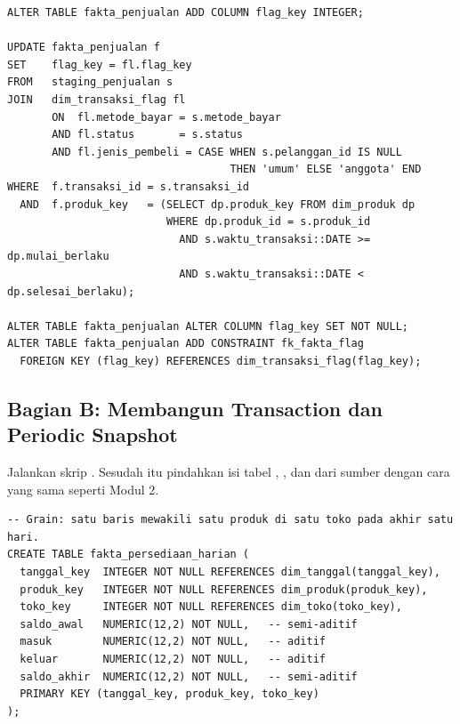 \begin{lstlisting}[style=sqlgaya]
ALTER TABLE fakta_penjualan ADD COLUMN flag_key INTEGER;

UPDATE fakta_penjualan f
SET    flag_key = fl.flag_key
FROM   staging_penjualan s
JOIN   dim_transaksi_flag fl
       ON  fl.metode_bayar = s.metode_bayar
       AND fl.status       = s.status
       AND fl.jenis_pembeli = CASE WHEN s.pelanggan_id IS NULL
                                   THEN 'umum' ELSE 'anggota' END
WHERE  f.transaksi_id = s.transaksi_id
  AND  f.produk_key   = (SELECT dp.produk_key FROM dim_produk dp
                         WHERE dp.produk_id = s.produk_id
                           AND s.waktu_transaksi::DATE >= dp.mulai_berlaku
                           AND s.waktu_transaksi::DATE <  dp.selesai_berlaku);

ALTER TABLE fakta_penjualan ALTER COLUMN flag_key SET NOT NULL;
ALTER TABLE fakta_penjualan ADD CONSTRAINT fk_fakta_flag
  FOREIGN KEY (flag_key) REFERENCES dim_transaksi_flag(flag_key);
\end{lstlisting}

\subsection{Bagian B: Membangun Transaction dan Periodic Snapshot}


Jalankan skrip . Sesudah itu pindahkan isi tabel
, , dan
 dari sumber dengan cara yang sama seperti Modul 2.


\begin{lstlisting}[style=sqlgaya]
-- Grain: satu baris mewakili satu produk di satu toko pada akhir satu hari.
CREATE TABLE fakta_persediaan_harian (
  tanggal_key  INTEGER NOT NULL REFERENCES dim_tanggal(tanggal_key),
  produk_key   INTEGER NOT NULL REFERENCES dim_produk(produk_key),
  toko_key     INTEGER NOT NULL REFERENCES dim_toko(toko_key),
  saldo_awal   NUMERIC(12,2) NOT NULL,   -- semi-aditif
  masuk        NUMERIC(12,2) NOT NULL,   -- aditif
  keluar       NUMERIC(12,2) NOT NULL,   -- aditif
  saldo_akhir  NUMERIC(12,2) NOT NULL,   -- semi-aditif
  PRIMARY KEY (tanggal_key, produk_key, toko_key)
);
\end{lstlisting}

